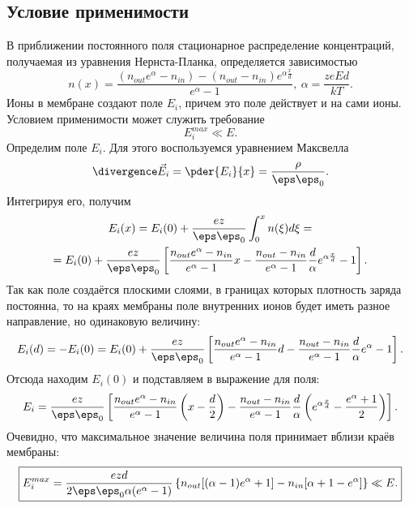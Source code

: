 \subsection{Условие применимости}
    В приближении постоянного поля стационарное распределение концентраций,
    получаемая из уравнения Нернста-Планка, определяется зависимостью
    \[
        n(x) = \frac{(n_{out}e^\alpha - n_{in}) - (n_{out} -
        n_{in})e^{\alpha\frac{x}{d}}}{e^\alpha - 1},\ \alpha = \frac{zeEd}{kT}.
    \]
    Ионы в мембране создают поле \( E_i \), причем это поле действует и на
    сами ионы. Условием применимости может служить требование
    \[
        E_i^{max} \ll E.
    \]
    Определим поле \( E_i \). Для этого воспользуемся уравнением Максвелла
    \[
        \divergence\vec{E}_i = \pder{E_i}{x} = \frac{\rho}{\eps\eps_0}.
    \]
    Интегрируя его, получим
    \begin{gather}
        E_i(x) = E_i(0) + \frac{ez}{\eps\eps_0}\int_0^x n(\xi)d\xi = \nonumber\\
        = E_i(0) + \frac{ez}{\eps\eps_0}\left[
        \frac{n_{out}e^\alpha - n_{in}}{e^\alpha - 1}x - \frac{n_{out} -
        n_{in}}{e^\alpha - 1}\frac{d}{\alpha}{e^{\alpha\frac{x}{d}} - 1}
        \right].
    \end{gather}
    Так как поле создаётся плоскими слоями, в границах которых плотность заряда
    постоянна, то на краях мембраны поле внутренних ионов будет иметь разное
    направление, но одинаковую величину:
    \begin{equation}
        E_i(d) = -E_i(0) = E_i(0) + \frac{ez}{\eps\eps_0}\left[
        \frac{n_{out}e^\alpha - n_{in}}{e^\alpha - 1}d - \frac{n_{out} -
        n_{in}}{e^\alpha - 1}\frac{d}{\alpha}{e^\alpha - 1}
        \right].
    \end{equation}
    Отсюда находим \( E_i(0) \) и подставляем в выражение для поля:
    \begin{equation}
        E_i = \frac{ez}{\eps\eps_0}\left[
        \frac{n_{out}e^\alpha - n_{in}}{e^\alpha - 1}\left(x-\frac{d}{2}\right)
        - \frac{n_{out} - n_{in}}{e^\alpha - 1}\frac{d}{\alpha}
        \left(e^{\alpha\frac{x}{d}} - \frac{e^\alpha + 1}{2}\right)
        \right].
    \end{equation}
    Очевидно, что максимальное значение величина поля принимает вблизи краёв
    мембраны:
    \begin{equation}
        \boxed{
        E_i^{max} = \frac{ezd}{2\eps\eps_0\alpha(e^\alpha - 1)}\left\{
            n_{out}[(\alpha - 1)e^\alpha + 1] - n_{in}[\alpha + 1 - e^\alpha]
        \right\} \ll E.}
    \end{equation}
